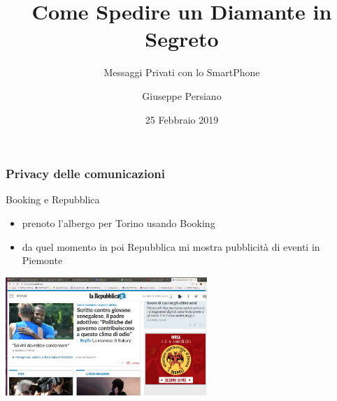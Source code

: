 \documentclass[]{beamer}
\title[]{Come Spedire un Diamante in Segreto}
\subtitle{Messaggi Privati con lo SmartPhone}
\author{Giuseppe Persiano}
\institute[UNISA]{%
Universit\`a di Salerno\\ \qquad \\
}
\date[Febbraio 2019] %
{25 Febbraio 2019}
\begin{document}
\newcommand{\zu}{\{0,1\}}
\newcommand{\ignore}[1]{}

\begin{frame}
  \titlepage
\end{frame}


\ignore{
    \begin{frame}
    \frametitle{Outline}
    \tableofcontents
    \end{frame}
}


\begin{frame}
\frametitle{Privacy delle comunicazioni}

\begin{block}{Booking e Repubblica}
\begin{itemize}
\item prenoto l'albergo per {\color{brown} Torino} usando {\color{magenta} Booking}
\item da quel momento in poi {\color{magenta} Repubblica}
mi mostra pubblicit\`a di eventi in {\color{brown} Piemonte}
\end{itemize}
\end{block}
\pause

\begin{center}
\includegraphics[width=3in]{Images/diamante/screenshot.png}
\end{center}
\end{frame}
\end{document}
